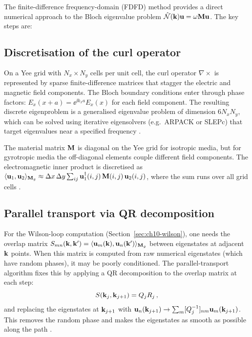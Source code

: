 The finite-difference frequency-domain (FDFD) method provides a
direct numerical approach to the Bloch eigenvalue problem
$\hat{\mathcal{N}}(\mathbf{k})\mathbf{u}=\omega\mathbf{M}\mathbf{u}$.  The key steps are:

\subsection{Discretisation of the curl operator}
\label{sec:ch10-fdfd-discretisation}

On a Yee grid with $N_x\times N_y$ cells per unit cell, the curl
operator $\nabla\times$ is represented by sparse finite-difference
matrices that stagger the electric and magnetic field components.
The Bloch boundary conditions enter through phase factors:
$E_x(x+a)=\ee^{\ii k_x a}E_x(x)$ for each field component.  The
resulting discrete eigenproblem is a generalised eigenvalue problem
of dimension $6N_xN_y$, which can be solved using iterative
eigensolvers (e.g.\ ARPACK or SLEPc) that target eigenvalues near a
specified frequency \cite{ozawa2018topological}.

The material matrix $\mathbf{M}$ is diagonal on the Yee grid for isotropic
media, but for gyrotropic media the off-diagonal elements couple
different field components.  The electromagnetic inner product is
discretised as
$\langle \mathbf{u}_1 , \mathbf{u}_2 \rangle_{\mathbf{M}_g}\approx\Delta x\,\Delta y\sum_{ij}
\mathbf{u}_1^\dagger(i,j)\,\mathbf{M}(i,j)\,\mathbf{u}_2(i,j)$,
where the sum runs over all grid cells
\cite{gangaraj2016berry}.

\subsection{Parallel transport via QR decomposition}
\label{sec:ch10-qr}

For the Wilson-loop computation (Section~\ref{sec:ch10-wilson}), one
needs the overlap matrix
$S_{mn}(\mathbf{k},\mathbf{k}')=\langle \mathbf{u}_m(\mathbf{k}) , \mathbf{u}_n(\mathbf{k}') \rangle_{\mathbf{M}_g}$
between eigenstates at adjacent $\mathbf{k}$ points.  When this matrix is
computed from raw numerical eigenstates (which have random phases), it
may be poorly conditioned.  The parallel-transport algorithm fixes
this by applying a QR decomposition to the overlap matrix at each
step:
\begin{equation}\label{eq:ch10-qr}
  S(\mathbf{k}_j,\mathbf{k}_{j+1}) = Q_j R_j\,,
\end{equation}
and replacing the eigenstates at $\mathbf{k}_{j+1}$ with
$\mathbf{u}_n(\mathbf{k}_{j+1})\to\sum_m[Q_j^{-1}]_{nm}\mathbf{u}_m(\mathbf{k}_{j+1})$.
This removes the random phase and makes the eigenstates as smooth as
possible along the path \cite{price2022roadmap}.

